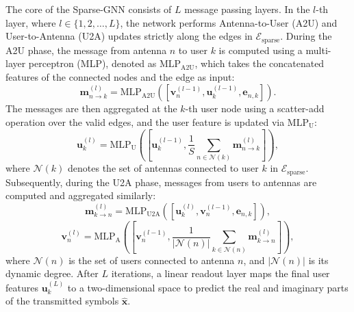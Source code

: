The core of the Sparse-GNN consists of $L$ message passing layers. In the $l$-th layer, where $l \in \{1, 2, \dots, L\}$, the network performs Antenna-to-User (A2U) and User-to-Antenna (U2A) updates strictly along the edges in $\mathcal{E}_{\text{sparse}}$. During the A2U phase, the message from antenna $n$ to user $k$ is computed using a multi-layer perceptron (MLP), denoted as $\text{MLP}_{\text{A2U}}$, which takes the concatenated features of the connected nodes and the edge as input:
\begin{equation}
    \mathbf{m}_{n \to k}^{(l)} = \text{MLP}_{\text{A2U}} \left( \left[ \mathbf{v}_n^{(l-1)}, \mathbf{u}_k^{(l-1)}, \mathbf{e}_{n,k} \right] \right).
\end{equation}
The messages are then aggregated at the $k$-th user node using a scatter-add operation over the valid edges, and the user feature is updated via $\text{MLP}_{\text{U}}$:
\begin{equation}
    \mathbf{u}_k^{(l)} = \text{MLP}_{\text{U}} \left( \left[ \mathbf{u}_k^{(l-1)}, \frac{1}{S} \sum_{n \in \mathcal{N}(k)} \mathbf{m}_{n \to k}^{(l)} \right] \right),
\end{equation}
where $\mathcal{N}(k)$ denotes the set of antennas connected to user $k$ in $\mathcal{E}_{\text{sparse}}$. Subsequently, during the U2A phase, messages from users to antennas are computed and aggregated similarly:
\begin{equation}
    \mathbf{m}_{k \to n}^{(l)} = \text{MLP}_{\text{U2A}} \left( \left[ \mathbf{u}_k^{(l)}, \mathbf{v}_n^{(l-1)}, \mathbf{e}_{n,k} \right] \right),
\end{equation}
\begin{equation}
    \mathbf{v}_n^{(l)} = \text{MLP}_{\text{A}} \left( \left[ \mathbf{v}_n^{(l-1)}, \frac{1}{|\mathcal{N}(n)|} \sum_{k \in \mathcal{N}(n)} \mathbf{m}_{k \to n}^{(l)} \right] \right),
\end{equation}
where $\mathcal{N}(n)$ is the set of users connected to antenna $n$, and $|\mathcal{N}(n)|$ is its dynamic degree. After $L$ iterations, a linear readout layer maps the final user features $\mathbf{u}_k^{(L)}$ to a two-dimensional space to predict the real and imaginary parts of the transmitted symbols $\hat{\mathbf{x}}$.

